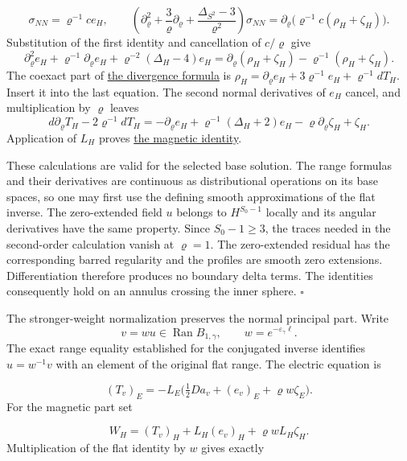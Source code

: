 \documentclass[
  english,
  11pt,
  reqno]{amsart}
\begin{document}
\label{eq:online-momentum-curl-equation} \[
\sigma_{NN}=\varrho^{-1}ce_H,
\qquad
\left(\partial_\varrho^2+\frac3\varrho\partial_\varrho
           +\frac{\Delta_{S^2}-3}{\varrho^2}\right)\sigma_{NN}
 =\partial_\varrho
       \bigl(\varrho^{-1}c(\rho_H+\zeta_H)\bigr).
\] Substitution of the first identity and cancellation of \(c/\varrho\)
give \[
\partial_\varrho^2e_H+\varrho^{-1}\partial_\varrho e_H
 +\varrho^{-2}(\Delta_H-4)e_H
 =\partial_\varrho(\rho_H+\zeta_H)
                         -\varrho^{-1}(\rho_H+\zeta_H).
\] The coexact part of
\hyperref[eq:online-momentum-radial-divergence]{the divergence formula}
is \(\rho_H=\partial_\varrho e_H+3\varrho^{-1}e_H+\varrho^{-1}dT_H\).
Insert it into the last equation. The second normal derivatives of
\(e_H\) cancel, and multiplication by \(\varrho\) leaves \[
d\partial_\varrho T_H-2\varrho^{-1}dT_H
 =-\partial_\varrho e_H+\varrho^{-1}(\Delta_H+2)e_H
                    -\varrho\partial_\varrho\zeta_H+\zeta_H.
\] Application of \(L_H\) proves
\hyperref[eq:online-momentum-magnetic-range]{the magnetic identity}.

These calculations are valid for the selected base solution. The range
formulas and their derivatives are continuous as distributional
operations on its base spaces, so one may first use the defining smooth
approximations of the flat inverse. The zero-extended field \(u\)
belongs to \(H^{S_0-1}\) locally and its angular derivatives have the
same property. Since \(S_0-1\ge3\), the traces needed in the
second-order calculation vanish at \(\varrho=1\). The zero-extended
residual has the corresponding barred regularity and the profiles are
smooth zero extensions. Differentiation therefore produces no boundary
delta terms. The identities consequently hold on an annulus crossing the
inner sphere. \hfill\(\square\)

The stronger-weight normalization preserves the normal principal part.
Write \[
v=w u\in\operatorname{Ran}B_{1,\gamma},
\qquad w=e^{-\varepsilon_\gamma\ell}.
\] The exact range equality established for the conjugated inverse
identifies \(u=w^{-1}v\) with an element of the original flat range. The
electric equation is

\label{eq:online-momentum-weighted-electric} \[
(T_v)_E
 =-L_E\bigl(\tfrac12Da_v+(e_v)_E
                              +\varrho w\zeta_E\bigr).
\] For the magnetic part set

\label{eq:online-momentum-weighted-W} \[
W_H=(T_v)_H+L_H(e_v)_H+\varrho wL_H\zeta_H.
\] Multiplication of the flat identity by \(w\) gives exactly
\end{document}
